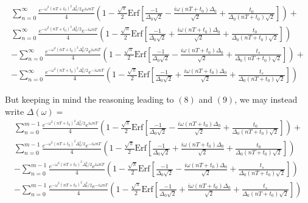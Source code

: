 \documentclass{article}
\begin{document}
\begin{gather}
\sum^{\infty}_{n=0}\frac{e^{-\omega^2(nT+t_0)^2\Delta^2_0/2}e^{i\omega nT}}{4}\left(1-\frac{\sqrt{\pi}}{2}\text{Erf}\left[\frac{-1}{\Delta_0\sqrt{2}}-\frac{i\omega (nT+t_0)\Delta_0}{\sqrt{2}}+\frac{t_0}{\Delta_0(nT+t_0)\sqrt{2}}\right]\right)+ \nonumber \\
\sum^{\infty}_{n=0}\frac{e^{-\omega^2(nT+t_0)^2\Delta^2_0/2}e^{-i\omega nT}}{4}\left(1-\frac{\sqrt{\pi}}{2}\text{Erf}\left[\frac{-1}{\Delta_0\sqrt{2}}+\frac{i\omega (nT+t_0)\Delta_0}{\sqrt{2}}+\frac{t_0}{\Delta_0(nT+t_0)\sqrt{2}}\right]\right) \nonumber \\
-\sum^{\infty}_{n=0}\frac{e^{-\omega^2(nT+t_0)^2\Delta^2_0/2}e^{i\omega nT}}{4}\left(1-\frac{\sqrt{\pi}}{2}\text{Erf}\left[\frac{-1}{\Delta_0\sqrt{2}}-\frac{i\omega (nT+t_0)\Delta_0}{\sqrt{2}}+\frac{t_s}{\Delta_0(nT+t_0)\sqrt{2}}\right]\right)+ \nonumber \\
-\sum^{\infty}_{n=0}\frac{e^{-\omega^2(nT+t_0)^2\Delta^2_0/2}e^{-i\omega nT}}{4}\left(1-\frac{\sqrt{\pi}}{2}\text{Erf}\left[\frac{-1}{\Delta_0\sqrt{2}}+\frac{i\omega (nT+t_0)\Delta_0}{\sqrt{2}}+\frac{t_s}{\Delta_0(nT+t_0)\sqrt{2}}\right]\right)
\end{gather}

But keeping in mind the reasoning leading to $(8)$ and $(9)$, we may instead write $\Delta(\omega)=$
\begin{gather}
\sum^{m-1}_{n=0}\frac{e^{-\omega^2(nT+t_0)^2\Delta^2_0/2}e^{i\omega nT}}{4}\left(1-\frac{\sqrt{\pi}}{2}\text{Erf}\left[\frac{-1}{\Delta_0\sqrt{2}}-\frac{i\omega (nT+t_0)\Delta_0}{\sqrt{2}}+\frac{t_0}{\Delta_0(nT+t_0)\sqrt{2}}\right]\right)\nonumber+\\ 
\sum^{m-1}_{n=0}\frac{e^{-\omega^2(nT+t_0)^2\Delta^2_0/2}e^{-i\omega nT}}{4}\left(1-\frac{\sqrt{\pi}}{2}\text{Erf}\left[\frac{-1}{\Delta_0\sqrt{2}}+\frac{i\omega (nT+t_0)\Delta_0}{\sqrt{2}}+\frac{t_0}{\Delta_0(nT+t_0)\sqrt{2}}\right]\right)\nonumber \\
-\sum^{m-1}_{n=0}\frac{e^{-\omega^2(nT+t_0)^2\Delta^2_0/2}e^{i\omega nT}}{4}\left(1-\frac{\sqrt{\pi}}{2}\text{Erf}\left[\frac{-1}{\Delta_0\sqrt{2}}-\frac{i\omega (nT+t_0)\Delta_0}{\sqrt{2}}+\frac{t_s}{\Delta_0(nT+t_0)\sqrt{2}}\right]\right)\nonumber \\ 
-\sum^{m-1}_{n=0}\frac{e^{-\omega^2(nT+t_0)^2\Delta^2_0/2}e^{-i\omega nT}}{4}\left(1-\frac{\sqrt{\pi}}{2}\text{Erf}\left[\frac{-1}{\Delta_0\sqrt{2}}+\frac{i\omega (nT+t_0)\Delta_0}{\sqrt{2}}+\frac{t_s}{\Delta_0(nT+t_0)\sqrt{2}}\right]\right)
\end{gather}
\end{document}
